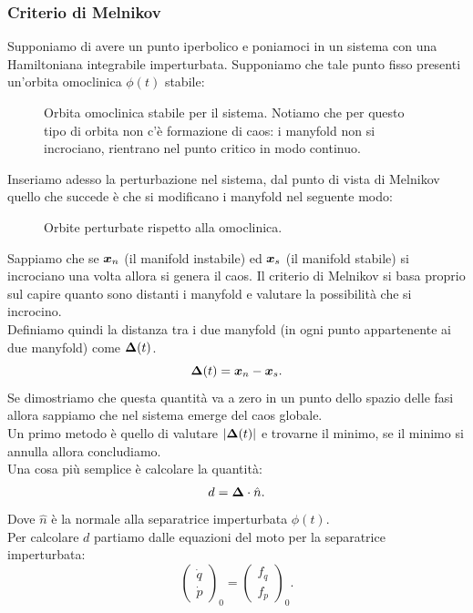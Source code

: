 \subsubsection{Criterio di Melnikov}%
\label{sub:Criterio di Melnikov}
Supponiamo di avere un punto iperbolico e poniamoci in un sistema con una Hamiltoniana integrabile imperturbata. Supponiamo che tale punto fisso presenti un'orbita omoclinica $\phi (t)$ stabile:
\begin{figure}[H]
    \centering
    \caption{\scriptsize Orbita omoclinica stabile per il sistema. Notiamo che per questo tipo di orbita non c'è formazione di caos: i manyfold non si incrociano, rientrano nel punto critico in modo continuo.}
    \label{fig:21_omoclinica}
\end{figure}
\noindent
Inseriamo adesso la perturbazione nel sistema, dal punto di vista di Melnikov quello che succede è che si modificano i manyfold nel seguente modo:
\begin{figure}[H]
    \centering
    \caption{\scriptsize Orbite perturbate rispetto alla omoclinica.}
    \label{fig:21_melni_pertrutbato}
\end{figure}
\noindent
Sappiamo che se $\boldsymbol{x}_n$ (il manifold instabile) ed $\boldsymbol{x}_s$ (il manifold stabile) si incrociano una volta allora si genera il caos. Il criterio di Melnikov si basa proprio sul capire quanto sono distanti i manyfold e valutare la possibilità che si incrocino. \\
Definiamo quindi la distanza tra i due manyfold (in ogni punto appartenente ai due manyfold) come $\boldsymbol{\Delta} (t)$. 
\[
    \boldsymbol{\Delta} (t) = \boldsymbol{x}_n - \boldsymbol{x}_s
.\] 
Se dimostriamo che questa quantità va a zero in un punto dello spazio delle fasi allora sappiamo che nel sistema emerge del caos globale.\\
Un primo metodo è quello di valutare $\left|\boldsymbol{\Delta} (t)\right|$ e trovarne il minimo, se il minimo si annulla allora concludiamo.\\
Una cosa più semplice è calcolare la quantità:
\[
    d = \boldsymbol{\Delta}\cdot \hat{n}
.\] 
Dove $\hat{n}$ è la normale alla separatrice imperturbata $\phi (t)$. \\
Per calcolare $d$ partiamo dalle equazioni del moto per la separatrice imperturbata:
\[
    \begin{pmatrix} \dot{q} \\ \dot{p}\end{pmatrix}_{0}  = 
    \begin{pmatrix}  
	f_q \\ f_p
    \end{pmatrix}_{0}
.\] 
